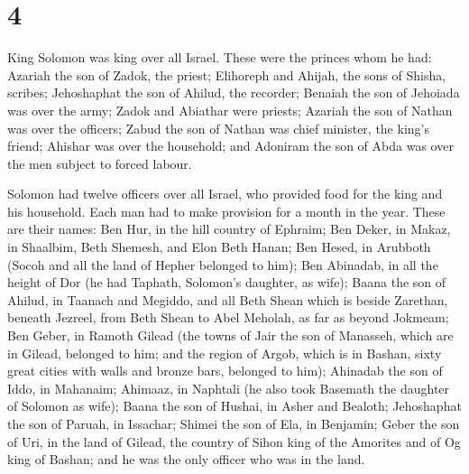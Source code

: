 \hypertarget{section-3}{%
\section{4}\label{section-3}}

 King Solomon was king over all Israel. 
These were the princes whom he had: Azariah the son of Zadok, the
priest;  Elihoreph and Ahijah, the sons of Shisha,
scribes; Jehoshaphat the son of Ahilud, the recorder; 
Benaiah the son of Jehoiada was over the army; Zadok and Abiathar were
priests;  Azariah the son of Nathan was over the officers;
Zabud the son of Nathan was chief minister, the king's friend;
 Ahishar was over the household; and Adoniram the son of
Abda was over the men subject to forced labour.

 Solomon had twelve officers over all Israel, who provided
food for the king and his household. Each man had to make provision for
a month in the year.  These are their names: Ben Hur, in
the hill country of Ephraim;  Ben Deker, in Makaz, in
Shaalbim, Beth Shemesh, and Elon Beth Hanan;  Ben Hesed,
in Arubboth (Socoh and all the land of Hepher belonged to him);
 Ben Abinadab, in all the height of Dor (he had Taphath,
Solomon's daughter, as wife);  Baana the son of Ahilud,
in Taanach and Megiddo, and all Beth Shean which is beside Zarethan,
beneath Jezreel, from Beth Shean to Abel Meholah, as far as beyond
Jokmeam;  Ben Geber, in Ramoth Gilead (the towns of Jair
the son of Manasseh, which are in Gilead, belonged to him; and the
region of Argob, which is in Bashan, sixty great cities with walls and
bronze bars, belonged to him);  Ahinadab the son of Iddo,
in Mahanaim;  Ahimaaz, in Naphtali (he also took Basemath
the daughter of Solomon as wife);  Baana the son of
Hushai, in Asher and Bealoth;  Jehoshaphat the son of
Paruah, in Issachar;  Shimei the son of Ela, in Benjamin;
 Geber the son of Uri, in the land of Gilead, the country
of Sihon king of the Amorites and of Og king of Bashan; and he was the
only officer who was in the land.

